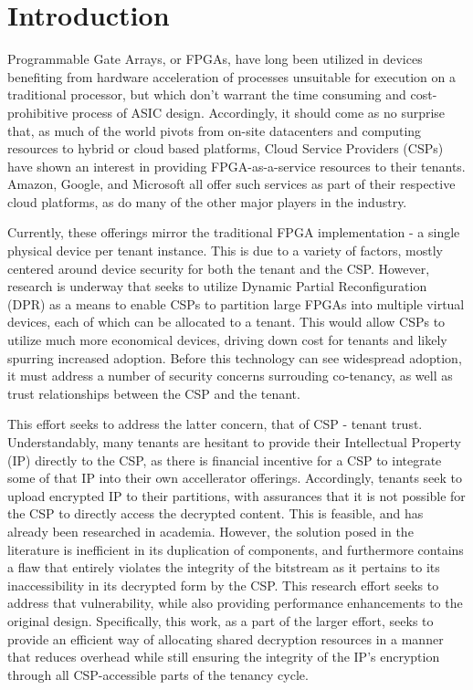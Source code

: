 
\section{Introduction} \label{sec:introduction}

 Programmable Gate Arrays, or FPGAs, have long been utilized in devices benefiting from hardware acceleration of processes unsuitable for execution on a traditional processor, but which don't warrant the time consuming and cost-prohibitive process of ASIC design. Accordingly, it should come as no surprise that, as much of the world pivots from on-site datacenters and computing resources to hybrid or cloud based platforms, Cloud Service Providers (CSPs) have shown an interest in providing FPGA-as-a-service resources to their tenants. Amazon, Google, and Microsoft all offer such services as part of their respective cloud platforms, as do many of the other major players in the industry. 

Currently, these offerings mirror the traditional FPGA implementation - a single physical device per tenant instance. This is due to a variety of factors, mostly centered around device security for both the tenant and the CSP. However, research is underway that seeks to utilize Dynamic Partial Reconfiguration (DPR) as a means to enable CSPs to partition large FPGAs into multiple virtual devices, each of which can be allocated to a tenant. This would allow CSPs to utilize much more economical devices, driving down cost for tenants and likely spurring increased adoption. Before this technology can see widespread adoption, it must address a number of security concerns surrouding co-tenancy, as well as trust relationships between the CSP and the tenant.

This effort seeks to address the latter concern, that of CSP - tenant trust. Understandably, many tenants are hesitant to provide their Intellectual Property (IP) directly to the CSP, as there is financial incentive for a CSP to integrate some of that IP into their own accellerator offerings. Accordingly, tenants seek to upload encrypted IP to their partitions, with assurances that it is not possible for the CSP to directly access the decrypted content. This is feasible, and has already been researched in academia. However, the solution posed in the literature is inefficient in its duplication of components, and furthermore contains a flaw that entirely violates the integrity of the bitstream as it pertains to its inaccessibility in its decrypted form by the CSP. This research effort seeks to address that vulnerability, while also providing performance enhancements to the original design. Specifically, this work, as a part of the larger effort, seeks to provide an efficient way of allocating shared decryption resources in a manner that reduces overhead while still ensuring the integrity of the IP's encryption through all CSP-accessible parts of the tenancy cycle.

